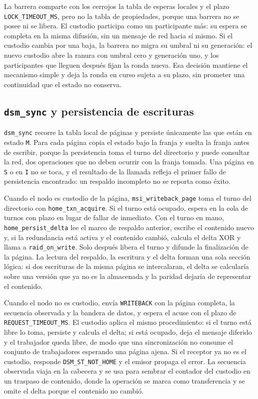 La barrera comparte con los cerrojos la tabla de esperas locales y el plazo \texttt{LOCK\_TIMEOUT\_MS}, pero no la tabla de propiedades, porque una barrera no se posee ni se libera. El custodio participa como un participante más: su espera se completa en la misma difusión, sin un mensaje de red hacia sí mismo. Si el custodio cambia por una baja, la barrera no migra su umbral ni su generación: el nuevo custodio abre la ranura con umbral cero y generación uno, y los participantes que lleguen después fijan la ronda nueva. Esa decisión mantiene el mecanismo simple y deja la ronda en curso sujeta a su plazo, sin prometer una continuidad que el estado no conserva.

\subsection{\texttt{dsm\_sync} y persistencia de escrituras}

\texttt{dsm\_sync} recorre la tabla local de páginas y persiste únicamente las que están en estado \texttt{M}. Para cada página copia el estado bajo la franja y suelta la franja antes de escribir, porque la persistencia toma el turno del directorio y puede consultar la red, dos operaciones que no deben ocurrir con la franja tomada. Una página en \texttt{S} o en \texttt{I} no se toca, y el resultado de la llamada refleja el primer fallo de persistencia encontrado: un respaldo incompleto no se reporta como éxito.

Cuando el nodo es custodio de la página, \texttt{msi\_writeback\_page} toma el turno del directorio con \texttt{home\_txn\_acquire}. Si el turno está ocupado, espera en la cola de turnos con plazo en lugar de fallar de inmediato. Con el turno en mano, \texttt{home\_persist\_delta} lee el marco de respaldo anterior, escribe el contenido nuevo y, si la redundancia está activa y el contenido cambió, calcula el delta XOR y llama a \texttt{raid\_on\_write}. Solo después libera el turno y difunde la finalización de la página. La lectura del respaldo, la escritura y el delta forman una sola sección lógica: si dos escrituras de la misma página se intercalaran, el delta se calcularía sobre una versión que ya no es la almacenada y la paridad dejaría de representar el contenido.

Cuando el nodo no es custodio, envía \texttt{WRITEBACK} con la página completa, la secuencia observada y la bandera de datos, y espera el acuse con el plazo de \texttt{REQUEST\_TIMEOUT\_MS}. El custodio aplica el mismo procedimiento: si el turno está libre lo toma, persiste y calcula el delta; si está ocupado, deja el mensaje diferido y el trabajador queda libre, de modo que una sincronización no consume el conjunto de trabajadores esperando una página ajena. Si el receptor ya no es el custodio, responde \texttt{DSM\_ST\_NOT\_HOME} y el emisor propaga el error. La secuencia observada viaja en la cabecera y se usa para sembrar el contador del custodio en un traspaso de contenido, donde la operación se marca como transferencia y se omite el delta porque el contenido no cambió.

